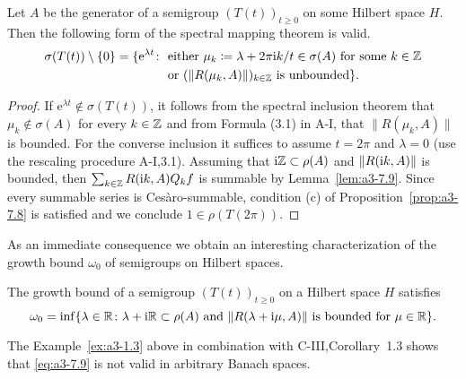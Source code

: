 \begin{theorem}\label{thm:a3-7.10}
Let $A$ be the generator of a semigroup $(T(t))_{t\geq 0}$ on some Hilbert space $H$.
Then the following form of the spectral mapping theorem is valid.
\begin{align*}
\sigma(T(t))\setminus\{0\} = \{\mathrm{e}^{\lambda t} \colon
& \text{ either } \mu_{k}\coloneqq \lambda + 2\pi\mathrm{i}  k/t \in \sigma(A) \text{ for some } k \in \mathbb{Z}\\
& \text{ or } (\|R(\mu_{k},A)\|)_{k\in\mathbb{Z}} \text{ is unbounded}\} .
\end{align*}
\end{theorem}
\begin{proof}
If $\mathrm{e}^{\lambda t} \not\in \sigma(T(t))$, it follows from the spectral inclusion theorem that $\mu_{k} \not\in \sigma(A)$ for every $k \in \mathbb{Z}$ and from Formula (3.1) in A-I, that $\|R(\mu_{k},A)\|$ is bounded.
For the converse inclusion it suffices to assume $t = 2\pi$ and $\lambda = 0$ (use the rescaling procedure A-I,3.1).
Assuming that $\mathrm{i}\mathbb{Z} \subset \rho(A)$ and $\|R(\mathrm{i} k,A)\|$ is bounded, then $\sum_{k\in\mathbb{Z}} R(\mathrm{i} k,A)Q_{k}f$ is summable by Lemma~\ref{lem:a3-7.9}.
Since every summable series is Cesàro-summable, condition (c) of Proposition~\ref{prop:a3-7.8} is satisfied and we conclude $1 \in \rho(T(2\pi))$.
\end{proof}
As an immediate consequence we obtain an interesting characterization of the growth bound $\omega_{0}$ of semigroups on Hilbert spaces.
\begin{corollary}\label{cor:a3-7.11}
The growth bound of a semigroup $(T(t))_{t\geq 0}$ on a Hilbert space $H$ satisfies
\begin{equation}\label{eq:a3-7.9}
\omega_{0} = \inf \{\lambda \in \mathbb{R} \colon \lambda + \mathrm{i}\mathbb{R} \subset \rho(A) \text{ and } \|R(\lambda+\mathrm{i}\mu,A)\| \text{ is bounded for } \mu \in \mathbb{R}\} .
\end{equation}
\end{corollary}
The Example~\ref{ex:a3-1.3} above in combination with C-III,Corollary~1.3 shows that \eqref{eq:a3-7.9} is not valid in arbitrary Banach spaces.
